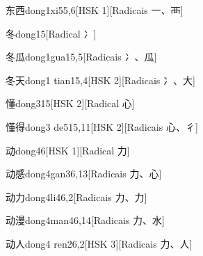 \begin{entry}{东西}{dong1xi5}{5,6}[HSK 1][Radicais ⼀、⾑]
\end{entry}

\begin{entry}{冬}{dong1}{5}[Radical ⼎]
\end{entry}

\begin{entry}{冬瓜}{dong1gua1}{5,5}[Radicais ⼎、⽠]
\end{entry}

\begin{entry}{冬天}{dong1 tian1}{5,4}[HSK 2][Radicais ⼎、⼤]
\end{entry}

\begin{entry}{懂}{dong3}{15}[HSK 2][Radical ⼼]
\end{entry}

\begin{entry}{懂得}{dong3 de5}{15,11}[HSK 2][Radicais ⼼、⼻]
\end{entry}

\begin{entry}{动}{dong4}{6}[HSK 1][Radical ⼒]
\end{entry}

\begin{entry}{动感}{dong4gan3}{6,13}[Radicais ⼒、⼼]
\end{entry}

\begin{entry}{动力}{dong4li4}{6,2}[Radicais ⼒、⼒]
\end{entry}

\begin{entry}{动漫}{dong4man4}{6,14}[Radicais ⼒、⽔]
\end{entry}

\begin{entry}{动人}{dong4 ren2}{6,2}[HSK 3][Radicais ⼒、⼈]
\end{entry}

